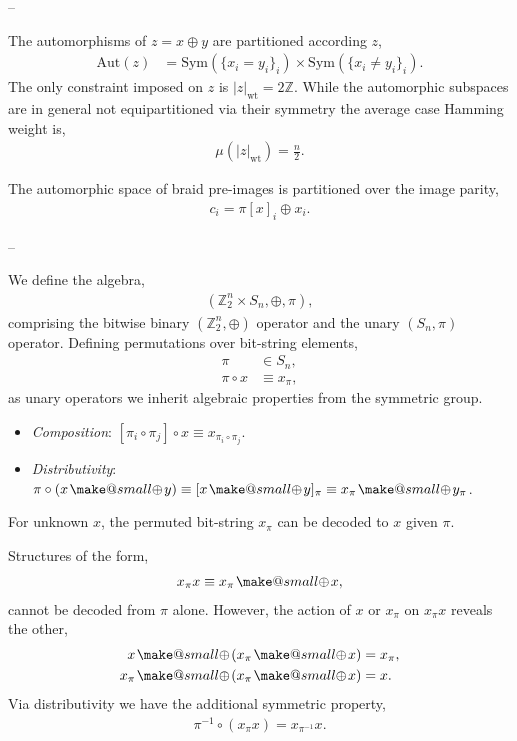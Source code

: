 \documentclass[twocolumn, aps, amsmath, amssymb, nofootinbib, superscriptaddress, longbibliography, doublefloatfix, table-of-contents, eqsecnum, rmp]{revtex4-2}
\makeatletter
\newcommand{\soplus}{{{\hspace{1pt}}{\mathbin{\mathpalette\make@small{\mathbin\oplus}}}}{\hspace{1pt}}}
\newcommand{\make@small}[2]{%
  \vcenter{\hbox{%
    \scalebox{0.6}{$\m@th#1#2$}%
  }}%
}
\makeatother
\begin{document}
--

The automorphisms of $z=x\oplus y$ are partitioned according $z$,
\begin{align}
	\mathrm{Aut}(z) &= \mathrm{Sym}(\{x_i=y_i\}_i) \times \mathrm{Sym}(\{x_i\neq y_i\}_i).
\end{align}
The only constraint imposed on $z$ is $|z|_\mathrm{wt}=2\mathbb{Z}$. While the automorphic subspaces are in general not equipartitioned via their symmetry the average case Hamming weight is,
\begin{align}
	\mu(|z|_\mathrm{wt}) = \frac{n}{2}.
\end{align}

The automorphic space of braid pre-images is partitioned over the image parity,
\begin{align}
	c_i = \pi[x]_i \oplus x_i.
\end{align}

--

We define the algebra,
\begin{align}
	(\mathbb{Z}_2^n \times S_n, \oplus,\pi),
\end{align}
comprising the bitwise binary $(\mathbb{Z}_2^n,\oplus)$ operator and the unary $(S_n,\pi)$ operator. Defining permutations over bit-string elements,
\begin{align}
	\pi &\in S_n,\nonumber\\
	\pi\circ x &\equiv x_\pi,
\end{align}
as unary operators we inherit algebraic properties from the symmetric group.
\begin{itemize}
	\item \emph{Composition}: $[\pi_i \circ \pi_j]\circ x \equiv x_{\pi_i\circ \pi_j}$.
	\item \emph{Distributivity}: $\pi\circ(x\soplus y) \equiv [x\soplus y]_\pi \equiv x_\pi \soplus y_\pi$.
\end{itemize}
For unknown $x$, the permuted bit-string $x_\pi$ can be decoded to $x$ given $\pi$.

Structures of the form,
\begin{align}
	x_\pi x \equiv x_\pi \soplus x,
\end{align}
cannot be decoded from $\pi$ alone. However, the action of $x$ or $x_\pi$ on $x_\pi x$ reveals the other,
\begin{align}
	x \soplus (x_\pi \soplus x) & = x_\pi,\nonumber\\
	x_\pi \soplus (x_\pi \soplus x) &= x.
\end{align}
Via distributivity we have the additional symmetric property,
\begin{align}
	\pi^{-1} \circ (x_\pi x)	 = x_{\pi^{-1}} x.
\end{align}
\end{document}
